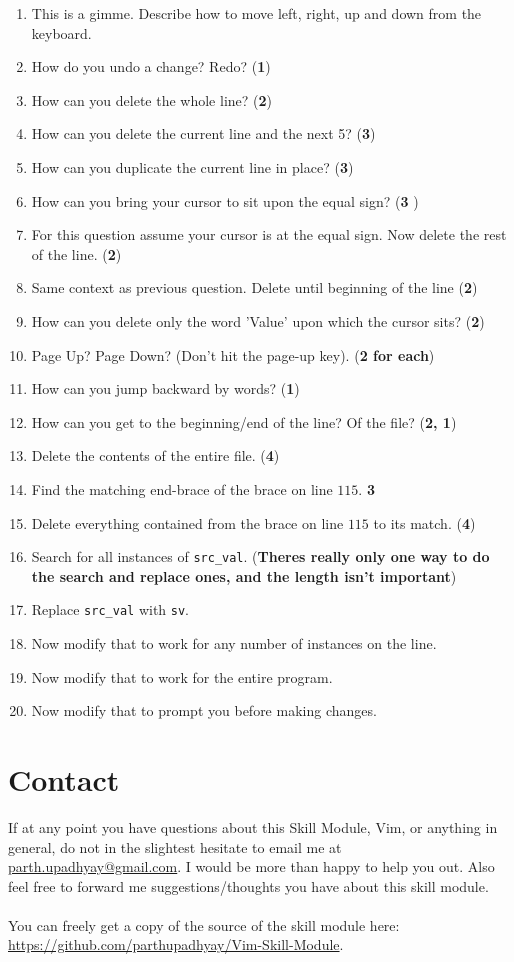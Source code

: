 \begin{enumerate}
\item This is a gimme. Describe how to move left, right, up and down from the keyboard.
\item How do you undo a change? Redo? ({\bf 1})
\item How can you delete the whole line? ({\bf 2})
\item How can you delete the current line and the next 5? ({\bf 3})
\item How can you duplicate the current line in place? ({\bf 3})
\item How can you bring your cursor to sit upon the equal sign? ({\bf 3 })
\item For this question assume your cursor is at the equal sign. Now delete the rest of the line. ({\bf 2})
\item Same context as previous question. Delete until beginning of the line ({\bf 2})
\item How can you delete only the word 'Value' upon which the cursor sits? ({\bf 2})
\item Page Up? Page Down? (Don't hit the page-up key). ({\bf 2 for each})
\item How can you jump backward by words? ({\bf 1})
\item How can you get to the beginning/end of the line? Of the file? ({\bf 2, 1})
\item Delete the contents of the entire file. ({\bf 4})
\item Find the matching end-brace of the brace on line $115$. {\bf 3}
\item Delete everything contained from the brace on line $115$ to its match. ({\bf 4})
\item Search for all instances of \texttt{src\_val}. ({\bf Theres really only one way to do the search and replace ones, and the length isn't important})
\item Replace \texttt{src\_val} with \texttt{sv}. 
\item Now modify that to work for any number of instances on the line.
\item Now modify that to work for the entire program.
\item Now modify that to prompt you before making changes.

\end{enumerate}

\section{Contact}
If at any point you have questions about this Skill Module, Vim, or anything
in general, do not in the slightest hesitate to email me at 
\url{parth.upadhyay@gmail.com}. I would be more than happy to help you out.
Also feel free to forward me suggestions/thoughts you have about this skill module.
\\\\
You can freely get a copy of the source of the skill module here:
\url{https://github.com/parthupadhyay/Vim-Skill-Module}.

